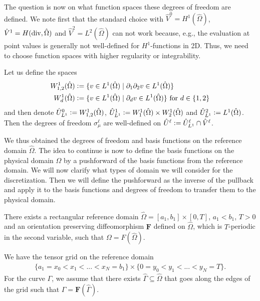 \documentclass[../master_thesis.tex]{subfiles}
\begin{document}
The question is now  on what function spaces these degrees of freedom are defined. We note first that 
the standard choice with $\hat{V}^0 = H^1(\hat{\Omega})$, 
$\hat{V}^1 = H(\operatorname{div},\hat{\Omega})$ and $\hat{V}^2 = L^2(\hat{\Omega})$ can not work 
because, e.g., the evaluation at point values is generally not well-defined for $H^1$-functions in 2D. Thus, 
we need to choose function spaces with higher regularity or integrability.

Let us define the spaces
\begin{align*}
    W^1_{1,2}(\hat{\Omega}) &\vcentcolon= \{ v \in L^1(\hat{\Omega}) \mid \partial_1 \partial_2 v
        \in L^1(\hat{\Omega}) \}
    \\  W^1_d(\hat{\Omega}) &\vcentcolon= \{ v \in L^1(\hat{\Omega}) \mid \partial_d v
        \in L^1(\hat{\Omega}) \} \text{ for } d\in \{1,2\}
\end{align*}
and then denote $\hat{U}_{L^1}^0 \vcentcolon= W^1_{1,2}(\hat{\Omega})$, 
$\hat{U}_{L^1}^1 \vcentcolon= W^1_1(\hat{\Omega}) \times W^1_2(\hat{\Omega})$
and $\hat{U}_{L^1}^2 \vcentcolon= L^1(\hat{\Omega})$. Then the degrees of freedom $\sigma_\mu^\ell$ are 
well-defined on $\hat{U}^\ell \vcentcolon= \hat{U}_{L^1}^\ell \cap \hat{V}^\ell$. 

We thus obtained the degrees of freedom and basis functions on the reference domain $\hat{\Omega}$. The idea 
to continue is now
to define the basis functions on the physical domain $\Omega$ by a 
pushforward of the basis functions from the reference domain. We will now clarify what 
types of domain we will consider for the discretization. Then we will define the pushforward 
as the inverse of the pullback and apply it to the basis functions and degrees of freedom 
to transfer them to the physical domain.

\begin{assumption}\label{ass:discretizable_single_patch_domain}
    There exists a rectangular reference domain $\hat{\Omega} = [a_1, b_1] \times [0, T]$,
    $a_1 < b_1$, $T>0$ 
    and an orientation preserving diffeomorphism $\mathbf{F}$ defined on $\hat{\Omega}$, which is $T$-periodic 
    in the second variable, such that
    $\Omega = F(\hat{\Omega})$. 
    
    We have the tensor grid on the reference domain
    \begin{align*}
        \{a_1 = x_0 < x_1 < ... < x_N = b_1\} \times \{0 = y_0 < y_1 < ... < y_N = T\}.
    \end{align*}
    For the curve $\Gamma$, we assume that there exists $\hat{\Gamma} \subseteq \hat{\Omega}$ 
    that goes along the edges of the grid such that $\Gamma = \mathbf{F}(\hat{\Gamma})$.
\end{assumption}
\end{document}
